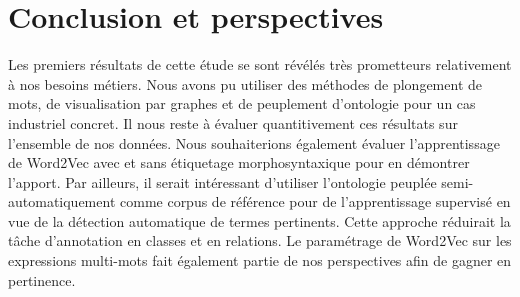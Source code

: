 \section{Conclusion et perspectives}
Les premiers résultats de cette étude se sont révélés très prometteurs relativement à nos besoins métiers. Nous avons pu utiliser des méthodes de plongement de mots, de visualisation par graphes et de peuplement d'ontologie pour un cas industriel concret. Il nous reste à évaluer quantitivement ces résultats sur l'ensemble de nos données. Nous souhaiterions également évaluer l'apprentissage de Word2Vec avec et sans étiquetage morphosyntaxique pour en démontrer l'apport. Par ailleurs, il serait intéressant d'utiliser l'ontologie peuplée semi-automatiquement comme corpus de référence pour de l'apprentissage supervisé en vue de la détection automatique de termes pertinents. Cette approche réduirait la tâche d'annotation en classes et en relations.
Le paramétrage de Word2Vec sur les expressions multi-mots fait également partie de nos perspectives afin de gagner en pertinence.
